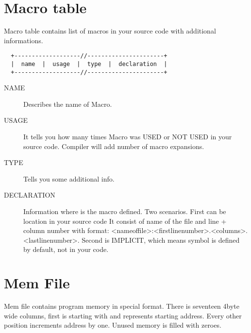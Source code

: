 \section{Macro table}
    Macro table contains list of macros in your source code with additional informations.

    {
        \usecodefont
        \verb'  +-------------------//----------------------+'\\
        \verb'  |  name  |  usage  |  type  |  declaration  |'\\
        \verb'  +-------------------//----------------------+'\\
    }

    \begin{description}
        \item[NAME]
            Describes the name of Macro.
        \item[USAGE]
            It tells you how many times Macro was USED or NOT USED in your source code. Compiler will add number of macro expansions.
        \item[TYPE]
            Tells you some additional info.
        \item[DECLARATION]
            Information where is the macro defined. Two scenarios. First can be location in your source code It consist of name of the file and line + column number with format: <nameoffile>:<firstlinenumber>.<columns>.<lastlinenumber>. Second is IMPLICIT, which means symbol is defined by default, not in your code.
    \end{description}

\section{Mem File}
    Mem file contains program memory in special format. There is seventeen 4byte wide columns, first is starting with \@ and represents starting address. Every other position increments address by one. Unused memory is filled with zeroes.

